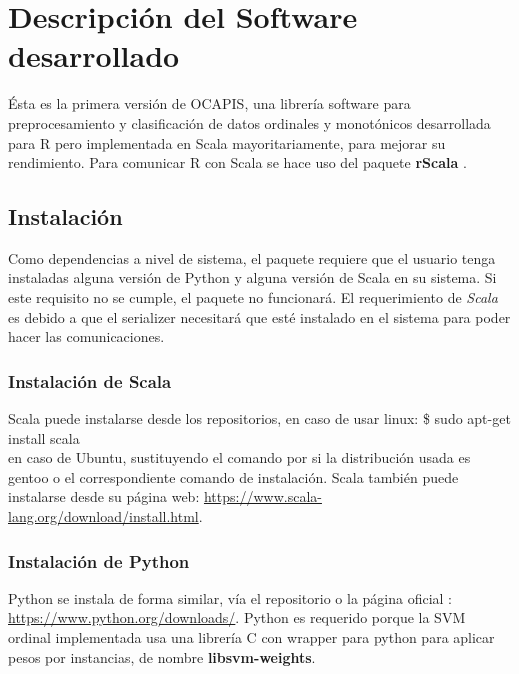 
\chapter{Descripción del Software desarrollado}

Ésta es la primera versión de OCAPIS, una librería software para preprocesamiento y clasificación de datos ordinales y monotónicos desarrollada para R pero implementada en Scala mayoritariamente, para mejorar su rendimiento. Para comunicar R con Scala se hace uso del paquete \textbf{rScala} \cite{dahlintegration}.

\section{Instalación}
Como dependencias a nivel de sistema, el paquete requiere que el usuario tenga instaladas alguna versión de Python y alguna versión de Scala en su sistema. Si este requisito no se cumple, el paquete no funcionará. El requerimiento de \textit{Scala} es debido a que el serializer necesitará que esté instalado en el sistema para poder hacer las comunicaciones. 
\subsection{Instalación de Scala}
Scala puede instalarse desde los repositorios, en caso de usar linux:
\vspace{3pt}
\hline
\vspace{7pt}
 \$ sudo apt-get install scala
 \vspace{7pt}
\hline
\vspace{3pt}\\
en caso de Ubuntu, sustituyendo el comando por  si la distribución usada es gentoo o el correspondiente comando de instalación. Scala también puede instalarse desde su página web: \url{https://www.scala-lang.org/download/install.html}. \newline

\subsection{Instalación de Python}
Python se instala de forma similar, vía el repositorio o la página oficial : \url{https://www.python.org/downloads/}. Python es requerido porque la SVM ordinal implementada usa una librería C con wrapper para python para aplicar pesos por instancias, de nombre \textbf{libsvm-weights}.

